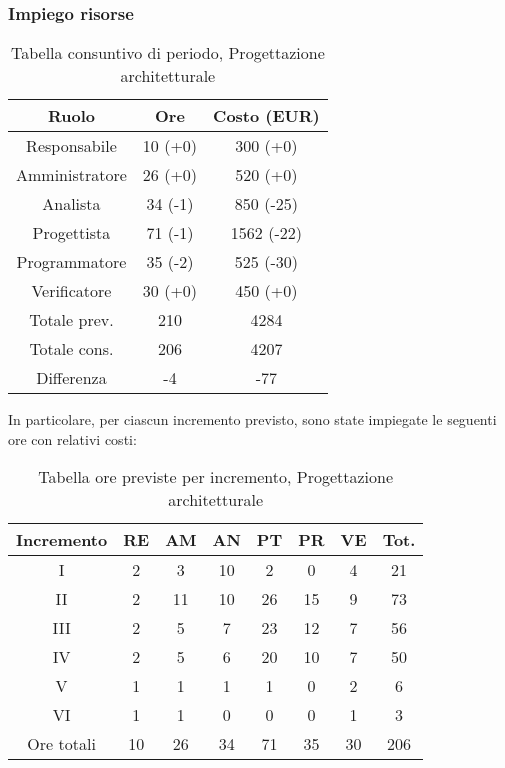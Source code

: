 \subsubsection{Impiego risorse}
\begin{table}[h]
\caption{Tabella consuntivo di periodo, Progettazione architetturale}  
\begin{center}
\begin{tabular}{ |c|c|c|  }
 \hline
 Ruolo 		& Ore & Costo (EUR)\\
 \hline\hline
	Responsabile	& 10 (+0) & 300 (+0)\\
	Amministratore	& 26 (+0) & 520 (+0)\\
	Analista		& 34 (-1) & 850 (-25)\\
	Progettista		& 71 (-1) & 1562 (-22)\\
	Programmatore	& 35 (-2) & 525 (-30)\\
	Verificatore	& 30 (+0) & 450 (+0)\\
	\hline\hline
	Totale prev.	& 210 & 4284 \\
	Totale cons.	& 206 & 4207 \\
	Differenza		& -4 & -77 \\
 \hline
\end{tabular}
\end{center}
\end{table}
\newpage
\noindent In particolare, per ciascun incremento previsto, sono state impiegate le seguenti ore con relativi costi:
\begin{table}[h]
	\caption{Tabella ore previste per incremento, Progettazione architetturale}  
	\begin{center}
		\begin{tabular}{ |c|c|c|c|c|c|c|c|  }
			\hline
			Incremento 		& RE 	& AM 	& AN 	& PT 	& PR 	& VE 	& Tot.\\
			\hline\hline
			I		& 2 		& 3			& 10 	& 2 	& 0 		& 4 		& 21\\
			II		& 2 		& 11 		& 10 	& 26	& 15 		& 9 		& 73\\
			III		& 2 		& 5 		& 7 	& 23	& 12 		& 7 		& 56\\
			IV		& 2 		& 5 		& 6 	& 20 	& 10 		& 7 		& 50\\
			V		& 1 		& 1 		& 1 	& 1		& 0 		& 2	 		& 6\\
			VI		& 1 		& 1 		& 0 	& 0 	& 0 		& 1 		& 3\\
			\hline\hline
			Ore totali		& 10		& 26		& 34 	& 71	 	& 35 	& 30 	& 206\\
			\hline
		\end{tabular}
	\end{center}
\end{table}


